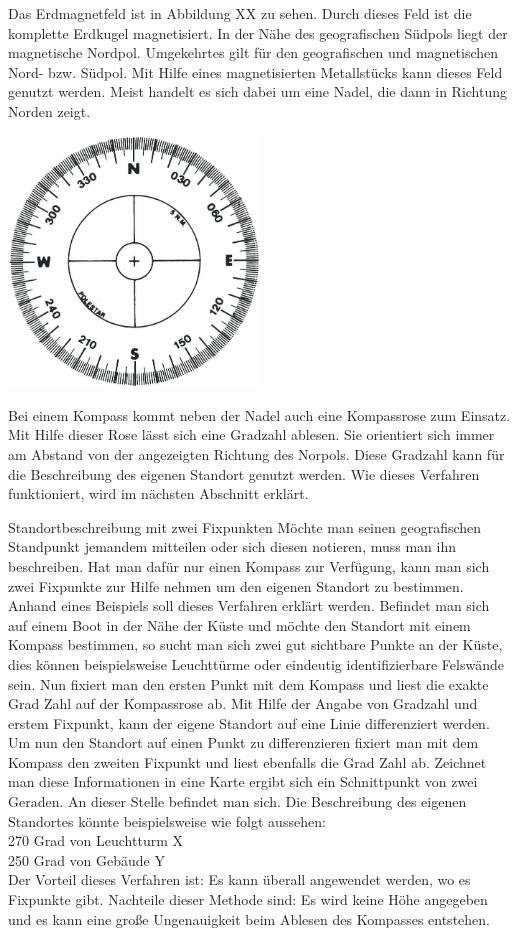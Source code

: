 Das Erdmagnetfeld ist in Abbildung XX zu sehen. Durch dieses Feld ist die komplette Erdkugel magnetisiert. In der Nähe des geografischen Südpols liegt der magnetische Nordpol. Umgekehrtes gilt für den geografischen und magnetischen Nord- bzw. Südpol.
Mit Hilfe eines magnetisierten Metallstücks kann dieses Feld genutzt werden. Meist handelt es sich dabei um  eine Nadel,  die dann in Richtung Norden zeigt.

\includegraphics[width=0.50\textwidth]{ref/images/kompassrose.jpg}
 
Bei einem Kompass kommt neben der Nadel auch eine Kompassrose zum Einsatz. Mit Hilfe dieser Rose lässt sich eine Gradzahl ablesen. Sie orientiert sich immer am Abstand von der angezeigten Richtung des Norpols. Diese Gradzahl kann für die Beschreibung des eigenen Standort genutzt werden. Wie dieses Verfahren funktioniert, wird im nächsten Abschnitt erklärt.

Standortbeschreibung mit zwei Fixpunkten
Möchte man seinen geografischen Standpunkt jemandem mitteilen oder sich diesen notieren, muss man ihn beschreiben. Hat man dafür nur einen Kompass zur Verfügung, kann man sich zwei Fixpunkte zur Hilfe nehmen um den eigenen Standort zu bestimmen.
Anhand eines Beispiels soll dieses Verfahren erklärt werden. Befindet man sich auf einem Boot in der Nähe der Küste und möchte den Standort mit einem Kompass bestimmen, so sucht man sich zwei gut sichtbare Punkte an der Küste, dies können beispielsweise Leuchttürme oder eindeutig identifizierbare Felswände sein. Nun fixiert man den ersten Punkt mit dem Kompass und liest die exakte Grad Zahl auf der Kompassrose ab. Mit Hilfe der Angabe von Gradzahl und erstem Fixpunkt, kann der eigene Standort auf eine Linie differenziert werden. Um nun den Standort auf einen Punkt zu differenzieren fixiert man mit dem Kompass den zweiten Fixpunkt und liest ebenfalls die Grad Zahl ab. Zeichnet man diese Informationen in eine Karte ergibt sich ein Schnittpunkt von zwei Geraden. An dieser Stelle befindet man sich. Die Beschreibung des eigenen Standortes könnte beispielsweise wie folgt aussehen:
\\270 Grad von Leuchtturm X
\\250 Grad von Gebäude Y
\\Der Vorteil dieses Verfahren ist: Es kann überall angewendet werden, wo es Fixpunkte gibt.
Nachteile dieser Methode sind: Es wird keine Höhe angegeben und es kann eine große Ungenauigkeit beim Ablesen des Kompasses entstehen.

